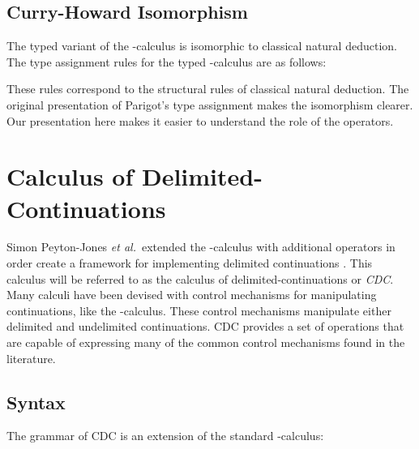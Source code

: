   \subsection{Curry-Howard Isomorphism}
  The typed variant of the \lmu-calculus is isomorphic to classical natural deduction.
  The type assignment rules for the typed \lmu-calculus are as follows:
  
  
  These rules correspond to the structural rules of classical natural deduction.
  The original presentation of Parigot's type assignment makes the isomorphism clearer.
  Our presentation here makes it easier to understand the role of the operators.

\section{Calculus of Delimited-Continuations}


  Simon Peyton-Jones \textit{et al.}\ extended the \lam-calculus with additional operators in order create a framework for implementing delimited continuations \cite{JonesDS07}. 
  This calculus will be referred to as the calculus of delimited-continuations or \emph{CDC}. 
  Many calculi have been devised with control mechanisms for manipulating continuations, like the \lmu-calculus.
  These control mechanisms manipulate either delimited and undelimited continuations. 
  CDC provides a set of operations that are capable of expressing many of the common control mechanisms found in the literature.

  \subsection{Syntax}
  The grammar of CDC is an extension of the standard \lam-calculus:

  \begin{figure}[!h]
  \end{figure}

